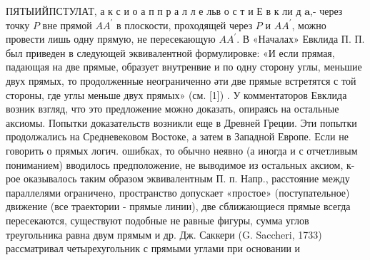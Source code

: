 \documentclass[10pt]{article}
\begin{document}
ПЯТЫИЙПСТУЛАТ, а к с и о а п п р а л л е льв о с т и Е в к ли д $\mathbf{a}$,- через точку $P$ вне прямой $A A^{\prime}$ в плоскости, проходящей через $P$ и $A A^{\prime}$, можно провести лишь одну прямую, не пересекающую $A A^{\prime}$. В «Началах» Евклида П. П. был приведен в следующей эквивалентной формулировке: «И если прямая, падающая на две прямые, образует внутренвие и по одну сторону углы, меньшие двух прямых, то продолженные неограниченно әти две прямые встретятся с той стороны, где углы меньше двух прямых» (см. [1]) . У комментаторов Евклида возник взгляд, что это предложение можно доказать, опираясь на остальные аксиомы. Попытки доказательств возникли еще в Древней Греции. Эти попытки продолжались на Средневековом Востоке, а затем в Западной Европе. Если не говорить о прямых логич. ошибках, то обычно неявно (а иногда и с отчетливым пониманием) вводилось предположение, не выводимое из остальных аксиом, к-рое оказывалось таким образом эквивалентным П. п. Напр., расстояние между параллелями ограничено, пространство допускает «простое» (поступательное) движение (все траектории - прямые линии), две сближающиеся прямые всегда пересекаются, существуют подобные не равные фигуры, сумма углов треугольника равна двум прямым и др. Дж. Саккери (G. Saccheri, 1733) рассматривал четырехугольник с прямыми углами при основании и
\end{document}
